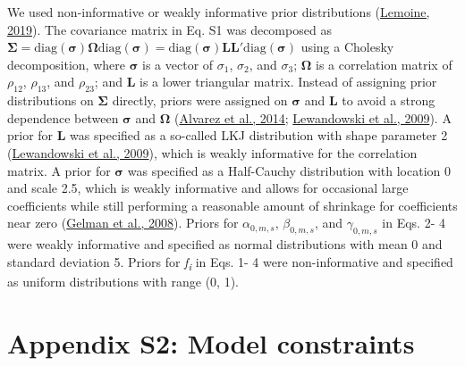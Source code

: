 \documentclass[
  12pt,
  letterpaper,
  DIV=11,
  numbers=noendperiod]{scrartcl}
\begin{document}
We used non-informative or weakly informative prior distributions
(\protect\hyperlink{ref-Lemoine2019}{Lemoine, 2019}). The covariance
matrix in Eq. S1 was decomposed as
\({\boldsymbol \Sigma} = \mathrm {diag}(\boldsymbol {\sigma}){\boldsymbol \Omega}\mathrm {diag}({\boldsymbol \sigma}) = \mathrm {diag}({\boldsymbol \sigma}){\boldsymbol L}{\boldsymbol L}\prime \mathrm {diag}({\boldsymbol \sigma})\)
using a Cholesky decomposition, where \(\boldsymbol {\sigma}\) is a
vector of \(\sigma_{1}\), \(\sigma_{2}\), and \(\sigma_{3}\);
\({\boldsymbol \Omega}\) is a correlation matrix of \(\rho_{12}\),
\(\rho_{13}\), and \(\rho_{23}\); and \textbf{L} is a lower triangular
matrix. Instead of assigning prior distributions on
\(\boldsymbol{\Sigma}\) directly, priors were assigned on
\({\boldsymbol \sigma}\) and \textbf{L} to avoid a strong dependence
between \({\boldsymbol \sigma}\) and \({\boldsymbol \Omega}\)
(\protect\hyperlink{ref-Alvarez2014}{Alvarez et al., 2014};
\protect\hyperlink{ref-Lewandowski2009}{Lewandowski et al., 2009}). A
prior for \textbf{L} was specified as a so-called LKJ distribution with
shape parameter 2 (\protect\hyperlink{ref-Lewandowski2009}{Lewandowski
et al., 2009}), which is weakly informative for the correlation matrix.
A prior for \(\boldsymbol{\sigma}\) was specified as a Half-Cauchy
distribution with location 0 and scale 2.5, which is weakly informative
and allows for occasional large coefficients while still performing a
reasonable amount of shrinkage for coefficients near zero
(\protect\hyperlink{ref-Gelman2008}{Gelman et al., 2008}). Priors for
\(\alpha_{0,m,s}\), \(\beta_{0,m,s}\), and \(\gamma_{0,m,s}\) in Eqs. 2-
4 were weakly informative and specified as normal distributions with
mean 0 and standard deviation 5. Priors for \emph{f\textsubscript{i}} in
Eqs. 1- 4 were non-informative and specified as uniform distributions
with range (0, 1).

\newpage

\hypertarget{appendix-s2-model-constraints}{%
\section{Appendix S2: Model
constraints}\label{appendix-s2-model-constraints}}
\end{document}
